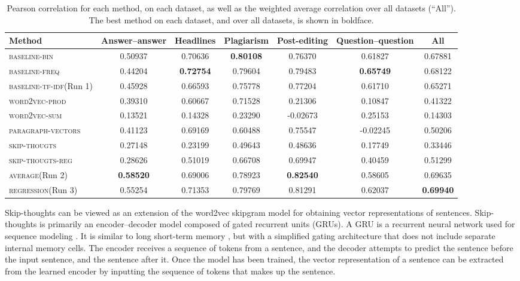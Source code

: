 \documentclass[11pt,letterpaper]{article}
\newcommand{\baselinebin}{\textsc{baseline-bin}\xspace}
\newcommand{\baselinefreq}{\textsc{baseline-freq}\xspace}
\newcommand{\baselinetfidf}{\textsc{baseline-tf-idf}\xspace}
\newcommand{\wordvecsum}{\textsc{word2vec-sum}\xspace}
\newcommand{\wordvecprod}{\textsc{word2vec-prod}\xspace}
\newcommand{\parvec}{\textsc{paragraph-vectors}\xspace}
\newcommand{\skipthoughts}{\textsc{skip-thougts}\xspace}
\newcommand{\skipthoughtsreg}{\textsc{skip-thougts-reg}\xspace}
\newcommand{\average}{\textsc{average}\xspace}
\newcommand{\reg}{\textsc{regression}\xspace}
\begin{document}
\begin{table*}
\small
 \setlength{\tabcolsep}{3pt}
\begin{center}
\begin{tabular}{lcccccc}
Method & Answer--answer & Headlines & Plagiarism & Post-editing & Question--question & All \\
\hline
\baselinebin & 0.50937 & 0.70636 & \textbf{0.80108} & \phantom{-}0.76370 & \phantom{-}0.61827 & 0.67881\\ 
\baselinefreq &0.44204 & \textbf{0.72754} &0.79604 & \phantom{-}0.79483 & \phantom{-}\textbf{0.65749} & 0.68122\\
\baselinetfidf (Run 1)  & 0.45928 & 0.66593 & 0.75778 & \phantom{-}0.77204 & \phantom{-}0.61710 & 0.65271\\ 
\wordvecprod  & 0.39310 & 0.60667 & 0.71528 & \phantom{-}0.21306 & \phantom{-}0.10847 & 0.41322\\ 
\wordvecsum & 0.13521 & 0.14328 & 0.23290 & -0.02673 & \phantom{-}0.25153 & 0.14303\\
\parvec  & 0.41123 & 0.69169 & 0.60488 & \phantom{-}0.75547 & -0.02245 & 0.50206\\ 
\skipthoughts  & 0.27148 & 0.23199 & 0.49643 & \phantom{-}0.48636 & \phantom{-}0.17749 & 0.33446\\ 
\skipthoughtsreg &0.28626 & 0.51019 & 0.66708 & 0.69947 & 0.40459 & 0.51299\\ 
\hline
\average (Run 2) & \textbf{0.58520} & 0.69006 & 0.78923 & \phantom{-}\textbf{0.82540} & \phantom{-}0.58605 & 0.69635 \\ 
\reg (Run 3) & 0.55254 & 0.71353 & 0.79769 & \phantom{-}0.81291 & \phantom{-}0.62037 & \textbf{0.69940}\\ 
\end{tabular}
\caption{Pearson correlation for each method, on each dataset, as well
  as the weighted average correlation over all datasets (``All''). The
  best method on each dataset, and over all datasets, is shown in
  boldface.\label{tbl:results}}
\end{center}
\end{table*}



Skip-thoughts \citep{Kiros+:2015} can be viewed as an extension of the
word2vec skipgram model for obtaining vector representations of
sentences. Skip-thoughts is primarily an encoder--decoder model
composed of gated recurrent units (GRUs). A GRU \citep{Cho2014} is a
recurrent neural network used for sequence modeling
\citep{Chung2014}. It is similar to long short-term memory
\citep{hochreiter1997long}, but with a simplified gating architecture
that does not include separate internal memory cells. The encoder
receives a sequence of tokens from a sentence, and the decoder
attempts to predict the sentence before the input sentence, and the
sentence after it. Once the model has been trained, the vector
representation of a sentence can be extracted from the learned encoder
by inputting the sequence of tokens that makes up the sentence.
\end{document}
